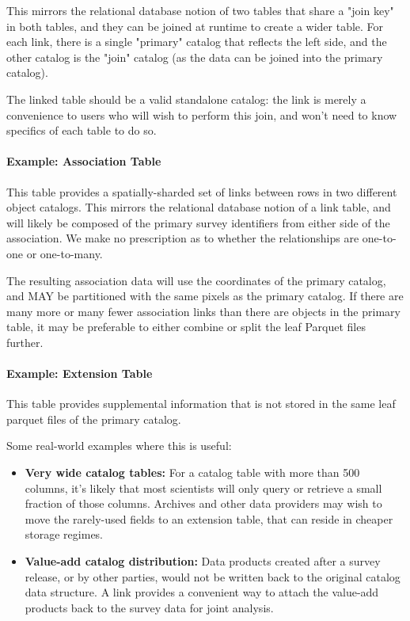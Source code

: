 \documentclass[11pt,a4paper]{ivoa}
\begin{document}
This mirrors the relational database notion of two tables that share a "join key" in both tables, and they can be joined at runtime to create a wider table.
For each link, there is a single "primary" catalog that reflects the left side, and the other catalog is the "join" catalog (as the data can be joined into the primary catalog).

The linked table should be a valid standalone catalog: the link is merely a convenience to users who will wish to perform this join, and won't need to know specifics of each table to do so.

\paragraph{Example: Association Table} \label{sec:association}

This table provides a spatially-sharded set of links between rows in two different object catalogs. 
This mirrors the relational database notion of a link table, and will likely be composed of the primary survey identifiers from either side of the association.
We make no prescription as to whether the relationships are one-to-one or one-to-many.

The resulting association data will use the coordinates of the primary catalog, and MAY be partitioned with the same pixels as the primary catalog.
If there are many more or many fewer association links than there are objects in the primary table, it may be preferable to either combine or split the leaf Parquet files further.

\paragraph{Example: Extension Table} \label{sec:extensionTable}

This table provides supplemental information that is not stored in the same leaf parquet files of the primary catalog. 

Some real-world examples where this is useful:

\begin{itemize}
    \item \textbf{Very wide catalog tables:} For a catalog table with more than 500 columns, it's likely that most scientists will only query or retrieve a small fraction of those columns.
    Archives and other data providers may wish to move the rarely-used fields to an extension table, that can reside in cheaper storage regimes.
    \item \textbf{Value-add catalog distribution:} Data products created after a survey release, or by other parties, would not be written back to the original catalog data structure.
    A link provides a convenient way to attach the value-add products back to the survey data for joint analysis.
\end{itemize}
\end{document}

